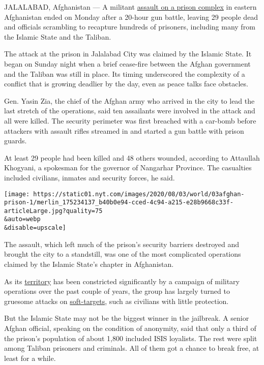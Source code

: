 JALALABAD, Afghanistan --- A militant
\href{https://www.nytimes.com/2020/08/02/world/asia/afghan-prison-attack-prisoners.html}{assault
on a prison complex} in eastern Afghanistan ended on Monday after a
20-hour gun battle, leaving 29 people dead and officials scrambling to
recapture hundreds of prisoners, including many from the Islamic State
and the Taliban.

The attack at the prison in Jalalabad City was claimed by the Islamic
State. It began on Sunday night when a brief cease-fire between the
Afghan government and the Taliban was still in place. Its timing
underscored the complexity of a conflict that is growing deadlier by the
day, even as peace talks face obstacles.

Gen. Yasin Zia, the chief of the Afghan army who arrived in the city to
lead the last stretch of the operations, said ten assailants were
involved in the attack and all were killed. The security perimeter was
first breached with a car-bomb before attackers with assault rifles
streamed in and started a gun battle with prison guards.

At least 29 people had been killed and 48 others wounded, according to
Attaullah Khogyani, a spokesman for the governor of Nangarhar Province.
The casualties included civilians, inmates and security forces, he said.

\texttt{[image: https://static01.nyt.com/images/2020/08/03/world/03afghan-prison-1/merlin\_175234137\_b40b0e94-cced-4c94-a215-e28b9668c33f-articleLarge.jpg?quality=75\\\&auto=webp\\\&disable=upscale]}

The assault, which left much of the prison's security barriers destroyed
and brought the city to a standstill, was one of the most complicated
operations claimed by the Islamic State's chapter in Afghanistan.

As its
\href{https://www.nytimes.com/2019/12/02/world/asia/ISIS-afghanistan-baghdadi.html}{territory}
has been constricted significantly by a campaign of military operations
over the past couple of years, the group has largely turned to gruesome
attacks on
\href{https://www.nytimes.com/2017/09/03/world/asia/shoes-kabul-mosque-bombing.html}{soft-targets},
such as civilians with little protection.

But the Islamic State may not be the biggest winner in the jailbreak. A
senior Afghan official, speaking on the condition of anonymity, said
that only a third of the prison's population of about 1,800 included
ISIS loyalists. The rest were split among Taliban prisoners and
criminals. All of them got a chance to break free, at least for a while.

